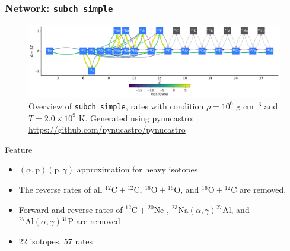 \documentclass[
	11pt, %
]{beamer}
\begin{document}
\begin{frame}
\frametitle{Network: {\tt subch simple}}
\begin{figure}
    \centering
    \includegraphics[width=1\linewidth]{subch_simple.pdf}
    \caption{\scriptsize Overview of {\tt subch simple}, rates with condition $\rho = 10^6$ g $\mathrm{cm}^{-3}$ and $T = 2.0 \times 10^9$ K. Generated using {\sf pynucastro}: \url {https://github.com/pynucastro/pynucastro}}
\end{figure}
\begin{block}{Feature}
    \begin{itemize}
        \item \scriptsize $(\alpha, \mbox{p})(\mbox{p}, \gamma)$ approximation for heavy isotopes
        \item \scriptsize The reverse rates of all ${}^{12}\mbox{C} + {}^{12}\mbox{C}$,  ${}^{16}\mbox{O} + {}^{16}\mbox{O}$, and ${}^{16}\mbox{O} + {}^{12}\mbox{C}$ are removed.
        \item \scriptsize Forward and reverse rates of ${}^{12}\mbox{C} + {}^{20}\mbox{Ne}$ , ${}^{23}\mbox{Na}(\alpha, \gamma){}^{27}\mbox{Al}$, and ${}^{27}\mbox{Al}(\alpha, \gamma){}^{31}\mbox{P}$ are removed
        \item 22 isotopes, 57 rates
    \end{itemize}
\end{block}
\end{frame}

    
        
\end{document}
